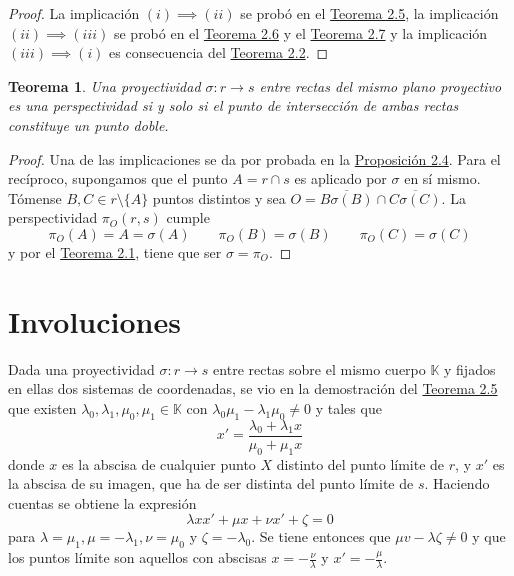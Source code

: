 \documentclass[12pt]{report}
\newtheorem{theorem}{Teorema}[chapter]
\theoremstyle{definition}
\theoremstyle{definition}
\theoremstyle{remark}
\begin{document}
\begin{proof}
La implicación $(i) \implies (ii)$ se probó en el \hyperref[teo2.5.]{\color{blue}Teorema 2.5}, la implicación $(ii) \implies (iii)$ se probó en el \hyperref[teo2.6.]{\color{blue}Teorema 2.6} y el \hyperref[teo2.7.]{\color{blue}Teorema 2.7} y la implicación $(iii) \implies (i)$ es consecuencia del \hyperref[teo2.2.]{\color{blue}Teorema 2.2}.
\end{proof}

\begin{theorem}
Una proyectividad $\sigma \colon r \to s$ entre rectas del mismo plano proyectivo es una perspectividad si y solo si el punto de intersección de ambas rectas constituye un punto doble.
\end{theorem}

\begin{proof}
Una de las implicaciones se da por probada en la \hyperref[prop2.4.]{\color{blue}Proposición 2.4}. Para el recíproco, supongamos que el punto $A = r \cap s$ es aplicado por $\sigma$ en sí mismo. Tómense $B,C \in r \setminus \{A\}$ puntos distintos y sea $O = \overline{B\sigma(B)} \cap \overline{C\sigma(C)}$. La perspectividad $\pi_O(r,s)$ cumple
\[\pi_O(A) = A = \sigma(A) \qquad \pi_O(B) = \sigma(B) \qquad \pi_O(C) = \sigma(C)\]
y por el \hyperref[teo2.1.]{\color{blue}Teorema 2.1}, tiene que ser $\sigma = \pi_O$.
\end{proof}

\section{Involuciones}

Dada una proyectividad $\sigma \colon r \to s$ entre rectas sobre el mismo cuerpo $\mathbb{K}$ y fijados en ellas dos sistemas de coordenadas, se vio en la demostración del \hyperref[teo2.5.]{\color{blue}Teorema 2.5} que existen $\lambda_0, \lambda_1, \mu_0, \mu_1 \in \mathbb{K}$ con $\lambda_0\mu_1-\lambda_1\mu_0 \neq 0$ y tales que
\[x' = \frac{\lambda_0+\lambda_1x}{\mu_0+\mu_1x}\]
donde $x$ es la abscisa de cualquier punto $X$ distinto del punto límite de $r$, y $x'$ es la abscisa de su imagen, que ha de ser distinta del punto límite de $s$. Haciendo cuentas se obtiene la expresión
\[\lambda xx'+\mu x+\nu x' + \zeta = 0\]
para $\lambda = \mu_1, \mu = -\lambda_1, \nu = \mu_0$ y $\zeta = -\lambda_0$. Se tiene entonces que $\mu v - \lambda \zeta \neq 0$ y que los puntos límite son aquellos con abscisas $x = -\frac{\nu}{\lambda}$ y $x' = -\frac{\mu}{\lambda}$.
\end{document}
